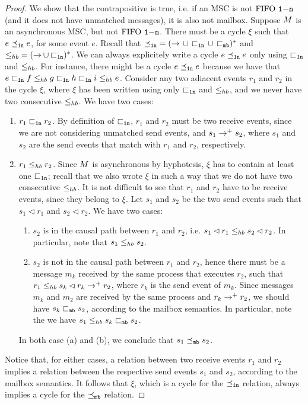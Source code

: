 \mbonennounmatched*
\begin{proof}
	We show that the contrapositive is true, i.e. if an MSC is not $\text{FIFO } \mathtt{1\mathsf{-}n}$ (and it does not have unmatched messages), it is also not mailbox. Suppose $M$ is an asynchronous MSC, but not $\text{FIFO } \mathtt{1\mathsf{-}n}$. There must be a cycle $\xi$ such that  $e \preceq_{\mathtt{1n}} e$, for some event $e$. Recall that ${\preceq_{\mathtt{1n}}} = ({\to} \,\cup\, {\sqsubset_{\mathtt{1n}}} \,\cup\, {\sqsubset_{\mathtt{mb}}})^\ast$ and ${\leq_{hb}} = ({\to} \cup {\sqsubset_{\ensuremath{\mathtt{1n}}}})^\ast$. We can always explicitely write a cycle $e \preceq_{\mathtt{1n}} e$ only using $\sqsubset_{\mathtt{1n}}$ and $\leq_{hb}$. For instance, there might be a cycle $e \preceq_{\mathtt{1n}} e$ because we have that $e \sqsubset_{\mathtt{1n}} f \leq_{hb} g \sqsubset_{\mathtt{1n}} h \sqsubset_{\mathtt{1n}} i \leq_{hb} e$. Consider any two adiacent events $r_1$ and $r_2$ in the cycle $\xi$, where $\xi$ has been written using only $\sqsubset_{\mathtt{1n}}$ and $\leq_{hb}$, and we never have two consecutive $\leq_{hb}$. We have two cases:
	\begin{enumerate}
		\item $r_1 \sqsubset_{\mathtt{1n}} r_2$. By definition of $\sqsubset_{\mathtt{1n}}$, $r_1$ and $r_2$ must be two receive events, since we are not considering unmatched send events, and $s_1 \to^+ s_2$, where $s_1$ and $s_2$ are the send events that match with $r_1$ and $r_2$, respectively.
		\item $r_1 \leq_{hb} r_2$. Since $M$ is asynchronous by hyphotesis, $\xi$ has to contain at least one $\sqsubset_{\mathtt{1n}}$; recall that we also wrote $\xi$ in such a way that we do not have two consecutive $\leq_{hb}$. It is not difficult to see that $r_1$ and $r_2$ have to be receive events, since they belong to $\xi$. Let $s_1$ and $s_2$ be the two send events such that $s_1 \lhd r_1$ and $s_2 \lhd r_2$. We have two cases:
		\begin{enumerate}
			\item $s_2$ is in the causal path between $r_1$ and $r_2$, i.e. $s_1 \lhd r_1 \leq_{hb} s_2 \lhd r_2$. In particular, note that $s_1 \leq_{hb} s_2$.
			\item $s_2$ is not in the causal path between $r_1$ and $r_2$, hence there must be a message $m_k$ received by the same process that executes $r_2$, such that $r_1 \leq_{hb} s_k \lhd r_k \to^+ r_2$, where $r_k$ is the send event of $m_k$. Since messages $m_k$ and $m_2$ are received by the same process and $r_k \to^+ r_2$, we should have $s_k \sqsubset_{\mathtt{mb}} s_2$, according to the mailbox semantics. In particular, note the we have $s_1 \leq_{hb} s_k \sqsubset_{\mathtt{mb}} s_2$.
		\end{enumerate}
		In both case (a) and (b), we conclude that $s_1 \preceq_{\mathtt{mb}} s_2$. %
	\end{enumerate}
	Notice that, for either cases, a relation between two receive events $r_1$ and $r_2$ implies a relation between the respective send events $s_1$ and $s_2$, according to the mailbox semantics. It follows that $\xi$, which is a cycle for the $\preceq_{\mathtt{1n}}$ relation, always implies a cycle for the $\preceq_{\mathtt{mb}}$ relation.
	\end{proof}

